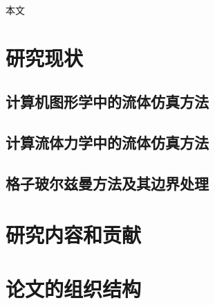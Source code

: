 本文

\section{研究现状}

\subsection{计算机图形学中的流体仿真方法}

\subsection{计算流体力学中的流体仿真方法}

\subsection{格子玻尔兹曼方法及其边界处理}

\section{研究内容和贡献}

\section{论文的组织结构}